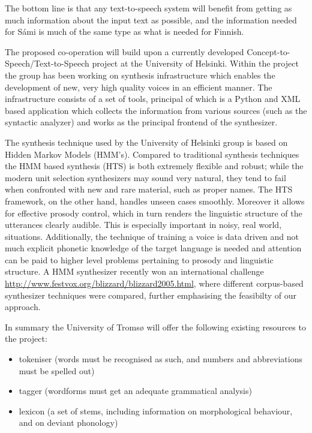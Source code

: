 \documentclass[a4paper,english]{article}
\begin{document}
The bottom line is that any text-to-speech system will benefit from getting as much information about the input text as possible, and the information needed for Sámi is much of the same type as what is needed for Finnish. 


The proposed co-operation will build upon a currently developed Concept-to-Speech/Text-to-Speech project at the University of Helsinki.  Within the project the group has been working on synthesis infrastructure which enables the development of new, very high quality voices in an efficient manner.  The infrastructure consists of a set of tools, principal of which is a Python and XML based application which collects the information from various sources (such as the syntactic analyzer) and works as the principal frontend of the synthesizer. 

The synthesis technique used by the University of Helsinki group is based on Hidden Markov Models (HMM's).  Compared to traditional synthesis techniques the HMM based synthesis (HTS) is both extremely flexible and robust; while the modern unit selection synthesizers may sound very natural, they tend to fail when confronted with new and rare material, such as proper names.  The HTS framework, on the other hand, handles unseen cases smoothly.  Moreover it allows for effective prosody control, which in turn renders the linguistic structure of the utterances clearly audible.  This is especially important in noisy, real world, situations. Additionally, the technique of training a voice is data driven and not much explicit phonetic knowledge of the target language is needed and attention can be paid to higher level problems pertaining to prosody and linguistic structure. A HMM synthesizer recently won an international challenge \url{http://www.festvox.org/blizzard/blizzard2005.html}, where different corpus-based synthesizer techniques were compared, further emphasising the feasibilty of our approach. 

In summary the University of Tromsø will offer the following existing resources to the project:

\begin{itemize}
\item  tokeniser (words must be recognised as such, and numbers and abbreviations must be spelled out)
\item  tagger (wordforms must get an adequate grammatical analysis)
\item  lexicon (a set of stems, including information on morphological behaviour, and on deviant phonology)
\end{itemize}
\end{document}
